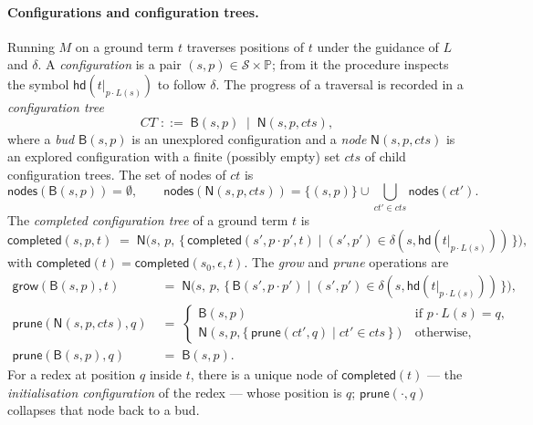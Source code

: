 \documentclass[11pt]{article}
\theoremstyle{plain}
\theoremstyle{definition}
\theoremstyle{remark}
\newcommand{\Pos}{\mathbb{P}}
\newcommand{\States}{\mathcal{S}}
\newcommand{\hd}{\mathsf{hd}}
\begin{document}
\paragraph{Configurations and configuration trees.}
Running $M$ on a ground term $t$ traverses positions of $t$ under the
guidance of $L$ and $\delta$. A \emph{configuration} is a pair $(s, p)
\in \States \times \Pos$; from it the procedure inspects the symbol
$\hd(t|_{p \cdot L(s)})$ to follow $\delta$. The progress of a
traversal is recorded in a \emph{configuration tree}
\[
  \mathit{CT} \;::=\; \mathsf{B}(s, p) \;\mid\; \mathsf{N}(s, p, \mathit{cts}),
\]
where a \emph{bud} $\mathsf{B}(s, p)$ is an unexplored configuration
and a \emph{node} $\mathsf{N}(s, p, \mathit{cts})$ is an explored
configuration with a finite (possibly empty) set $\mathit{cts}$ of
child configuration trees. The set of nodes of $\mathit{ct}$ is
\[
  \mathsf{nodes}(\mathsf{B}(s, p)) = \emptyset, \qquad
  \mathsf{nodes}(\mathsf{N}(s, p, \mathit{cts}))
  = \{(s, p)\} \cup \!\!\bigcup_{\mathit{ct}' \in \mathit{cts}}\!\!
       \mathsf{nodes}(\mathit{ct}').
\]
The \emph{completed configuration tree} of a ground term $t$ is
\[
  \mathsf{completed}(s, p, t)
  \;=\;
  \mathsf{N}\!\bigl(s,\, p,\, \{\, \mathsf{completed}(s', p \cdot p', t)
                                   \mid (s', p') \in \delta(s, \hd(t|_{p \cdot L(s)})) \,\}\bigr),
\]
with $\mathsf{completed}(t) = \mathsf{completed}(s_{0}, \epsilon, t)$.
The \emph{grow} and \emph{prune} operations are
\begin{align*}
\mathsf{grow}(\mathsf{B}(s, p), t) \;&=\;
  \mathsf{N}\!\bigl(s,\, p,\, \{\, \mathsf{B}(s', p \cdot p')
                                   \mid (s', p') \in \delta(s, \hd(t|_{p \cdot L(s)})) \,\}\bigr),\\
\mathsf{prune}(\mathsf{N}(s, p, \mathit{cts}), q) \;&=\;
  \begin{cases}
    \mathsf{B}(s, p) & \text{if } p \cdot L(s) = q,\\
    \mathsf{N}(s, p, \{\, \mathsf{prune}(\mathit{ct}', q) \mid \mathit{ct}' \in \mathit{cts}\,\}) & \text{otherwise},
  \end{cases}\\
\mathsf{prune}(\mathsf{B}(s, p), q) \;&=\; \mathsf{B}(s, p).
\end{align*}
For a redex at position $q$ inside $t$, there is a unique node of
$\mathsf{completed}(t)$ --- the \emph{initialisation configuration} of
the redex --- whose position is $q$; $\mathsf{prune}(\cdot, q)$
collapses that node back to a bud.
\end{document}
